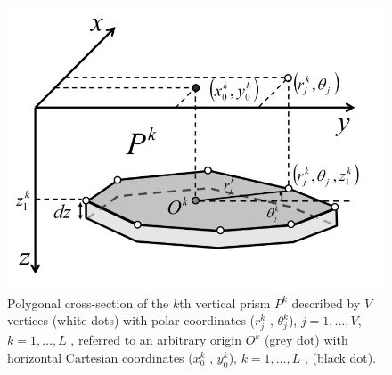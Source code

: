 \begin{figure}
    \centering
    \includegraphics[scale=0.3]{figures/prism_parameters_mod.png}
    \caption{Polygonal cross-section of the $k$th vertical prism $P^k$ described by $V$ vertices (white dots) with polar coordinates ($r^k_j$ , $\theta ^k_j$), $j = 1, \dots, V$, $k = 1, \dots, L$ , referred to an arbitrary origin $O^k$ (grey dot) with horizontal Cartesian coordinates ($x_0^k$ , $y_0^k$), $k = 1, \dots, L$ , (black dot).}
    \label{fig:prism_parameters}
\end{figure}

